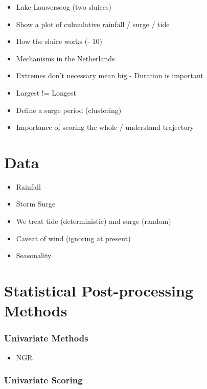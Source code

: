 \documentclass[]{article}
\providecommand{\tightlist}{%
  \setlength{\itemsep}{0pt}\setlength{\parskip}{0pt}}
\begin{document}
\begin{itemize}
\item
  Lake Lauwersoog (two sluices)
\item
  Show a plot of culmulative rainfall / surge / tide
\item
  How the sluice works (- 10)
\item
  Mechanisms in the Netherlands
\item
  Extremes don't necessary mean big - Duration is important
\item
  Largest != Longest
\item
  Define a surge period (clustering)
\item
  Importance of scoring the whole / understand trajectory
\end{itemize}

\section{Data}\label{data}

\begin{itemize}
\item
  Rainfall
\item
  Storm Surge
\item
  We treat tide (deterministic) and surge (random)
\item
  Caveat of wind (ignoring at present)
\item
  Seasonality
\end{itemize}

\section{Statistical Post-processing
Methods}\label{statistical-post-processing-methods}

\subsubsection{Univariate Methods}\label{univariate-methods}

\begin{itemize}
\tightlist
\item
  NGR
\end{itemize}

\subsubsection{Univariate Scoring}\label{univariate-scoring}
\end{document}
